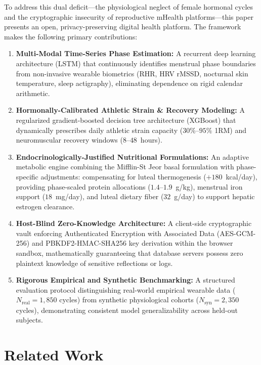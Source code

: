 \documentclass[conference]{IEEEtran}
\begin{document}
To address this dual deficit---the physiological neglect of female hormonal cycles and the cryptographic insecurity of reproductive mHealth platforms---this paper presents an open, privacy-preserving digital health platform. The framework makes the following primary contributions:
\begin{enumerate}
    \item \textbf{Multi-Modal Time-Series Phase Estimation:} A recurrent deep learning architecture (LSTM) that continuously identifies menstrual phase boundaries from non-invasive wearable biometrics (RHR, HRV rMSSD, nocturnal skin temperature, sleep actigraphy), eliminating dependence on rigid calendar arithmetic.
    \item \textbf{Hormonally-Calibrated Athletic Strain \& Recovery Modeling:} A regularized gradient-boosted decision tree architecture (XGBoost) that dynamically prescribes daily athletic strain capacity ($30\%$--$95\%$ 1RM) and neuromuscular recovery windows ($8$--$48$~hours).
    \item \textbf{Endocrinologically-Justified Nutritional Formulations:} An adaptive metabolic engine combining the Mifflin-St Jeor basal formulation with phase-specific adjustments: compensating for luteal thermogenesis ($+180$~kcal/day), providing phase-scaled protein allocations ($1.4$--$1.9$~g/kg), menstrual iron support ($18$~mg/day), and luteal dietary fiber ($32$~g/day) to support hepatic estrogen clearance.
    \item \textbf{Host-Blind Zero-Knowledge Architecture:} A client-side cryptographic vault enforcing Authenticated Encryption with Associated Data (AES-GCM-256) and PBKDF2-HMAC-SHA256 key derivation within the browser sandbox, mathematically guaranteeing that database servers possess zero plaintext knowledge of sensitive reflections or logs.
    \item \textbf{Rigorous Empirical and Synthetic Benchmarking:} A structured evaluation protocol distinguishing real-world empirical wearable data ($N_{\text{real}} = 1{,}850$ cycles) from synthetic physiological cohorts ($N_{\text{syn}} = 2{,}350$ cycles), demonstrating consistent model generalizability across held-out subjects.
\end{enumerate}

\section{Related Work}
\end{document}
